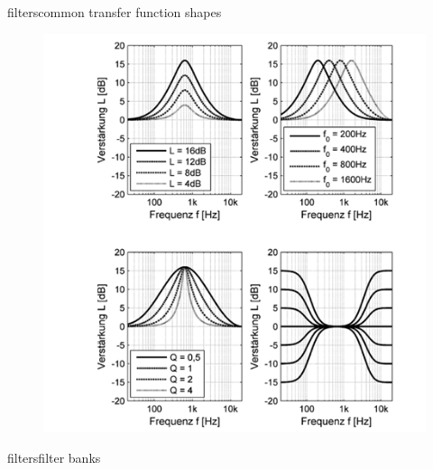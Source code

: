 	\begin{frame}{filters}{common transfer function shapes}
			\begin{figure}
				\centerline{\includegraphics[scale=.5]{graph/filter}}
			\end{figure}
	\end{frame}
    \begin{frame}{filters}{filter banks}
        \vspace{-3mm}
        \vspace{-2mm}
    \end{frame}
    
